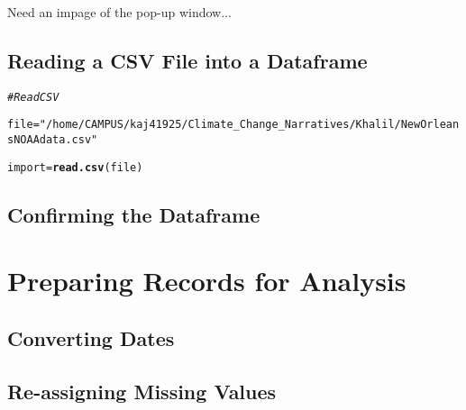 \documentclass{article}\usepackage[]{graphicx}\usepackage[]{color}
\makeatletter
\newcommand{\hlstr}[1]{\textcolor[rgb]{0.192,0.494,0.8}{#1}}%
\newcommand{\hlcom}[1]{\textcolor[rgb]{0.678,0.584,0.686}{\textit{#1}}}%
\newcommand{\hlstd}[1]{\textcolor[rgb]{0.345,0.345,0.345}{#1}}%
\newcommand{\hlkwb}[1]{\textcolor[rgb]{0.69,0.353,0.396}{#1}}%
\newcommand{\hlkwd}[1]{\textcolor[rgb]{0.737,0.353,0.396}{\textbf{#1}}}%
\newenvironment{kframe}{%
 \def\at@end@of@kframe{}%
 \ifinner\ifhmode%
  \def\at@end@of@kframe{\end{minipage}}%
  \begin{minipage}{\columnwidth}%
 \fi\fi%
 \def\FrameCommand##1{\hskip\@totalleftmargin \hskip-\fboxsep
 \colorbox{shadecolor}{##1}\hskip-\fboxsep
     \hskip-\linewidth \hskip-\@totalleftmargin \hskip\columnwidth}%
 \MakeFramed {\advance\hsize-\width
   \@totalleftmargin\z@ \linewidth\hsize
   \@setminipage}}%
 {\par\unskip\endMakeFramed%
 \at@end@of@kframe}
\newenvironment{knitrout}{}{} %
\makeatother
\begin{document}
Need an impage of the pop-up window...

\subsection{Reading a CSV File into a Dataframe}

\begin{knitrout}
\color{fgcolor}\begin{kframe}
\begin{alltt}
\hlcom{# Read CSV}

\hlstd{file} \hlkwb{=} \hlstr{"/home/CAMPUS/kaj41925/Climate_Change_Narratives/Khalil/NewOrleansNOAAdata.csv"}

\hlstd{import} \hlkwb{=} \hlkwd{read.csv}\hlstd{(file)}
\end{alltt}
\end{kframe}
\end{knitrout}

\subsection{Confirming the Dataframe}

\section{Preparing Records for Analysis}

\subsection{Converting Dates}

\subsection{Re-assigning Missing Values}
\end{document}
